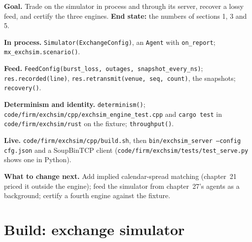 \begin{tutorial}
\textbf{Goal.} Trade on the simulator in process and through its server, recover a lossy feed, and certify the three engines.
\textbf{End state:} the numbers of sections 1, 3 and 5.
\begin{tutsteps}
\item \textbf{In process.} \texttt{Simulator(ExchangeConfig)}, an \texttt{Agent} with \texttt{on\_report}; \texttt{mx\_exchsim.scenario()}.
\item \textbf{Feed.} \texttt{FeedConfig(burst\_loss, outages, snapshot\_every\_ns)}; \texttt{res.recorded(line)}, \texttt{res.retransmit(venue, seq, count)},
the snapshots; \texttt{recovery()}.
\item \textbf{Determinism and identity.} \texttt{determinism()}; \texttt{code/firm/exchsim/cpp/exchsim\_engine\_test.cpp} and \texttt{cargo test} in
\texttt{code/firm/exchsim/rust} on the fixture; \texttt{throughput()}.
\item \textbf{Live.} \texttt{code/firm/exchsim/cpp/build.sh}, then \texttt{bin/exchsim\_server --config cfg.json} and a SoupBinTCP client
(\texttt{code/firm/exchsim/tests/test\_serve.py} shows one in Python).
\end{tutsteps}
\textbf{What to change next.} Add implied calendar-spread matching (chapter~21 priced it outside the engine); feed the simulator from chapter~27's agents
as a background; certify a fourth engine against the fixture.
\end{tutorial}

\section{Build: exchange simulator}\label{bld:mx:build-a-matching-engine-and-exchange-simulator:exchsim}

